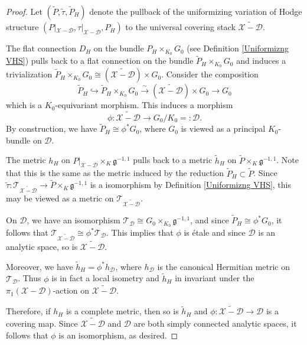 \documentclass[10pt,a4paper]{amsart}
\begin{document}
\begin{proof}
Let $(\widetilde{P},\widetilde{\tau},\widetilde{P}_H)$ denote the pullback of the uniformizing variation of Hodge structure $(P|_{\mathscr{X}-\mathscr{D}},\tau|_{\mathscr{X}-\mathscr{D}},P_H)$ to the universal covering stack $\widetilde{\mathscr{X}-\mathscr{D}}$.

The flat connection $D_H$ on the bundle $P_H\times_{K_0}G_0$ (see Definition \ref{Uniformizng VHS}) pulls back to a flat connection on the bundle $\widetilde{P}_H\times_{K_0}G_0$ and induces a trivialization $\widetilde{P}_H\times_{K_0}G_0\cong(\widetilde{\mathscr{X}-\mathscr{D}})\times G_0$. Consider the composition
\[
\widetilde{P}_H\hookrightarrow\widetilde{P}_H\times_{K_0}G_0\xrightarrow{\sim}(\widetilde{\mathscr{X}-\mathscr{D}})\times G_0\to G_0
\]
which is a $K_0$-equivariant morphism. This induces a morphism 
\[
\phi:\widetilde{\mathscr{X}-\mathscr{D}}\to G_0/K_0=:\mathcal{D}.
\] 
By construction, we have $\widetilde{P}_H\cong\phi^*G_0$, where $G_0$ is viewed as a principal $K_0$-bundle on $\mathcal{D}$.

The metric $h_H$ on $P|_{\mathscr{X}-\mathscr{D}}\times_K\mathfrak{g}^{-1,1}$ pulls back to a metric $\widetilde{h}_H$ on $\widetilde{P}\times_K\mathfrak{g}^{-1,1}$. Note that this is the same as the metric induced by the reduction $\widetilde{P}_H\subset\widetilde{P}$. Since $\widetilde{\tau}:\mathcal{T}_{\widetilde{\mathscr{X}-\mathscr{D}}}\to\widetilde{P}\times_K\mathfrak{g}^{-1,1}$ is a isomorphism by Definition \ref{Uniformizng VHS}, this may be viewed as a metric on $\mathcal{T}_{\widetilde{\mathscr{X}-\mathscr{D}}}$.

On $\mathcal{D}$, we have an isomorphism $\mathcal{T}_{\mathcal{D}}\cong G_0\times_{K_0}\mathfrak{g}^{-1,1}$, and since $\widetilde{P}_H\cong\phi^*G_0$, it follows that $\mathcal{T}_{\widetilde{\mathscr{X}-\mathscr{D}}}\cong\phi^*\mathcal{T}_{\mathcal{D}}$. This implies that $\phi$ is \'etale and since $\mathcal{D}$ is an analytic space, so is $\widetilde{\mathscr{X}-\mathscr{D}}$.

Moreover, we have $\widetilde{h}_H=\phi^*h_\mathcal{D}$, where $h_{\mathcal{D}}$ is the canonical Hermitian metric on $\mathcal{T}_{\mathcal{D}}$. Thus $\phi$ is in fact a local isometry and $\widetilde{h}_H$ in invariant under the $\pi_1(\mathscr{X}-\mathscr{D})$-action on $\widetilde{\mathscr{X}-\mathscr{D}}$.

Therefore, if $h_H$ is a complete metric, then so is $\widetilde{h}_H$ and $\phi:\widetilde{\mathscr{X}-\mathscr{D}}\to\mathcal{D}$ is a covering map. Since $\widetilde{\mathscr{X}-\mathscr{D}}$ and $\mathcal{D}$ are both simply connected analytic spaces, it follows that $\phi$ is an isomorphism, as desired. 
\end{proof}
\end{document}
